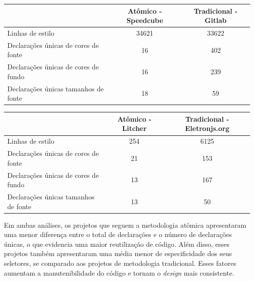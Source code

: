 \begin{table}[H]
\begin{tabular}{|l|c|c|}
\hline
                                     & \textbf{Atômico - Speedcube} & \textbf{Tradicional - Gitlab} \\ \hline
Linhas de estilo                     & 34621                        & 33622                         \\ \hline
Declarações únicas de cores de fonte & 16                           & 402                           \\ \hline
Declarações únicas de cores de fundo & 16                           & 239                           \\ \hline
Declarações únicas tamanhos de fonte & 18                           & 59                            \\ \hline
\end{tabular}
\end{table}

\begin{table}[H]
\begin{tabular}{|l|c|c|}
\hline
                                     & \textbf{Atômico - Litcher} & \textbf{Tradicional - Eletronjs.org} \\ \hline
Linhas de estilo                     & 254                        & 6125                                 \\ \hline
Declarações únicas de cores de fonte & 21                         & 153                                  \\ \hline
Declarações únicas de cores de fundo & 13                         & 167                                  \\ \hline
Declarações únicas tamanhos de fonte & 13                         & 50                                   \\ \hline
\end{tabular}
\end{table}

Em ambas análises, os projetos que seguem a metodologia atômica apresentaram uma menor diferença entre o total de declarações e o número de declarações únicas, o que evidencia uma maior reutilização de código. Além disso, esses projetos também apresentaram uma média menor de especificidade dos seus seletores, se comparado aos projetos de metodologia tradicional. Esses fatores aumentam a manutenibilidade do código e tornam o \emph{design} mais consistente.



